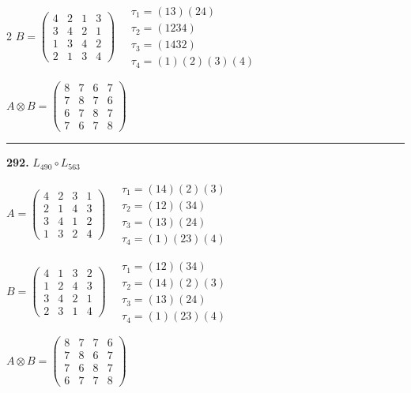 \begin{multicols}{2}
$B = \begin{pmatrix} 4 & 2 & 1 & 3 \\ 3 & 4 & 2 & 1 \\ 1 & 3 & 4 & 2 \\ 2 & 1 & 3 & 4 \end{pmatrix} \quad \begin{matrix} \tau_{1}=(1 3)(2 4) \\ \tau_{2}=(1 2 3 4) \\ \tau_{3}=(1 4 3 2) \\ \tau_{4}=(1)(2)(3)(4) \end{matrix}$

$A \otimes B = \begin{pmatrix} 8 & 7 & 6 & 7 \\ 7 & 8 & 7 & 6 \\ 6 & 7 & 8 & 7 \\ 7 & 6 & 7 & 8 \end{pmatrix}$

\vspace{0.3em}
\hrule
\vspace{0.3em}

\noindent\textbf{292.} $L_{490} \circ L_{563}$

$A = \begin{pmatrix} 4 & 2 & 3 & 1 \\ 2 & 1 & 4 & 3 \\ 3 & 4 & 1 & 2 \\ 1 & 3 & 2 & 4 \end{pmatrix} \quad \begin{matrix} \tau_{1}=(1 4)(2)(3) \\ \tau_{2}=(1 2)(3 4) \\ \tau_{3}=(1 3)(2 4) \\ \tau_{4}=(1)(2 3)(4) \end{matrix}$

$B = \begin{pmatrix} 4 & 1 & 3 & 2 \\ 1 & 2 & 4 & 3 \\ 3 & 4 & 2 & 1 \\ 2 & 3 & 1 & 4 \end{pmatrix} \quad \begin{matrix} \tau_{1}=(1 2)(3 4) \\ \tau_{2}=(1 4)(2)(3) \\ \tau_{3}=(1 3)(2 4) \\ \tau_{4}=(1)(2 3)(4) \end{matrix}$

$A \otimes B = \begin{pmatrix} 8 & 7 & 7 & 6 \\ 7 & 8 & 6 & 7 \\ 7 & 6 & 8 & 7 \\ 6 & 7 & 7 & 8 \end{pmatrix}$


\end{multicols}
